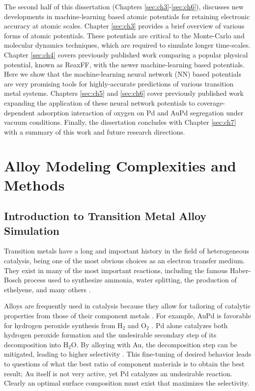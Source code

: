 \documentclass[12pt]{cmuthesis}
\begin{document}
The second half of this dissertation (Chapters \ref{sec:ch3}-\ref{sec:ch6}), discusses new developments in machine-learning based atomic potentials for retaining electronic accuracy at atomic scales. Chapter \ref{sec:ch3} provides a brief overview of various forms of atomic potentials. These potentials are critical to the Monte-Carlo and molecular dynamics techniques, which are required to simulate longer time-scales. Chapter \ref{sec:ch4} covers previously published work \cite{boes-2016-neural-networ} comparing a popular physical potential, known as ReaxFF, with the newer machine-learning based potentials. Here we show that the machine-learning neural network (NN) based potentials \cite{behler-2007-gener-neural} are very promising tools for highly-accurate predictions of various transition metal systems. Chapters \ref{sec:ch5} and \ref{sec:ch6} cover previously published work \cite{boes-2017-neural-networ,boes-2017-model-segreg} expanding the application of these neural network potentials to coverage-dependent adsorption interaction of oxygen on Pd and AuPd segregation under vacuum conditions. Finally, the dissertation concludes with Chapter \ref{sec:ch7} with a summary of this work and future research directions.

\chapter{Alloy Modeling Complexities and Methods}
\label{sec:ch1}
\section{Introduction to Transition Metal Alloy Simulation}
\label{sec:org05ae2fd}
Transition metals have a long and important history in the field of heterogeneous catalysis, being one of the most obvious choices as an electron transfer medium. They exist in many of the most important reactions, including the famous Haber-Bosch process \cite{liu-2014-ammon-synth} used to synthesize ammonia, water splitting, the production of ethelyene, and many others \cite{zhang-2016-homog-disper,greeley-2004-alloy-catal}.

Alloys are frequently used in catalysis because they allow for tailoring of catalytic properties from those of their component metals \cite{ponec-2001-alloy-catal,yu-2012-review-pt}. For example, AuPd is favorable for hydrogen peroxide synthesis from H\(_{\text{2}}\) and O\(_{\text{2}}\) \cite{landon-2003-direc-synth}. Pd alone catalyzes both hydrogen peroxide formation and the undesirable secondary step of its decomposition into H\(_{\text{2}}\)O. By alloying with Au, the decomposition step can be mitigated, leading to higher selectivity \cite{edwards-2009-switc-off,plauck-2016-activ-sites}. This fine-tuning of desired behavior leads to questions of what the best ratio of component materials is to obtain the best result; Au itself is not very active, yet Pd catalyzes an undesirable reaction. Clearly an optimal surface composition must exist that maximizes the selectivity.
\end{document}
